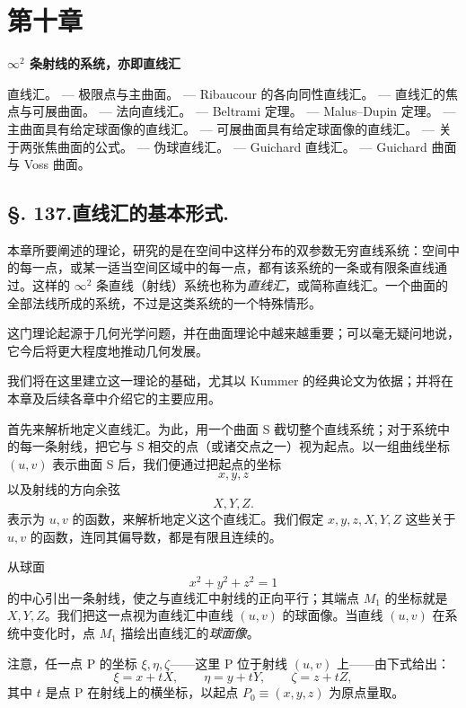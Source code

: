 \section*{第十章}
\begin{center}
{\Large\bfseries \(\infty^2\) 条射线的系统，亦即直线汇}
\end{center}

\noindent 直线汇。 --- 极限点与主曲面。 --- Ribaucour 的各向同性直线汇。 --- 直线汇的焦点与可展曲面。 --- 法向直线汇。 --- Beltrami 定理。 --- Malus--Dupin 定理。 --- 主曲面具有给定球面像的直线汇。 --- 可展曲面具有给定球面像的直线汇。 --- 关于两张焦曲面的公式。 --- 伪球直线汇。 --- Guichard 直线汇。 --- Guichard 曲面与 Voss 曲面。

\subsection*{\S. 137.\quad 直线汇的基本形式.}

本章所要阐述的理论，研究的是在空间中这样分布的双参数无穷直线系统：空间中的每一点，或某一适当空间区域中的每一点，都有该系统的一条或有限条直线通过。这样的 \(\infty^2\) 条直线（射线）系统也称为\emph{直线汇}，或简称直线汇。一个曲面的全部法线所成的系统，不过是这类系统的一个特殊情形。

这门理论起源于几何光学问题，并在曲面理论中越来越重要；可以毫无疑问地说，它今后将更大程度地推动几何发展。

我们将在这里建立这一理论的基础，尤其以 Kummer 的经典论文为依据；并将在本章及后续各章中介绍它的主要应用。

首先来解析地定义直线汇。为此，用一个曲面 S 截切整个直线系统；对于系统中的每一条射线，把它与 S 相交的点（或诸交点之一）视为起点。以一组曲线坐标 \((u,v)\) 表示曲面 S 后，我们便通过把起点的坐标
\[
 x,y,z
\]
以及射线的方向余弦
\[
 X,Y,Z.
\]
表示为 \(u,v\) 的函数，来解析地定义这个直线汇。我们假定 \(x,y,z,X,Y,Z\) 这些关于 \(u,v\) 的函数，连同其偏导数，都是有限且连续的。

从球面
\[
 x^2+y^2+z^2=1
\]
的中心引出一条射线，使之与直线汇中射线的正向平行；其端点 \(M_1\) 的坐标就是 \(X,Y,Z\)。我们把这一点视为直线汇中直线 \((u,v)\) 的球面像。当直线 \((u,v)\) 在系统中变化时，点 \(M_1\) 描绘出直线汇的\emph{球面像}。

注意，任一点 P 的坐标 \(\xi,\eta,\zeta\)——这里 P 位于射线 \((u,v)\) 上——由下式给出：
\begin{equation}\tag{1}
 \xi=x+tX,
 \qquad
 \eta=y+tY,
 \qquad
 \zeta=z+tZ,
\end{equation}
其中 \(t\) 是点 P 在射线上的横坐标，以起点 \(P_0\equiv(x,y,z)\) 为原点量取。

